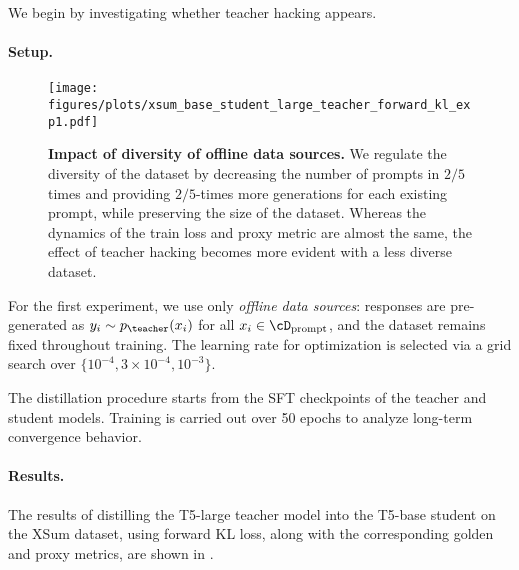 We begin by investigating whether teacher hacking appears. %

\paragraph{Setup.}
\begin{figure*}[ht]
    \centering
    \texttt{[image: figures/plots/xsum\_base\_student\_large\_teacher\_forward\_kl\_exp1.pdf]}
    \caption{\textbf{Impact of diversity of offline data sources.} 
    We regulate the diversity of the dataset by decreasing the number of prompts in $2/5$ times and providing $2/5$-times more generations for each existing prompt, while preserving the size of the dataset.
    Whereas the dynamics of the train loss and proxy metric are almost the same, the effect of teacher hacking becomes more evident with a less diverse dataset.    
    }
    \label{fig:exp_large_to_base_diversity_fwd_kl}

\end{figure*}


For the first experiment, we use only \textit{offline data sources}: responses are pre-generated as $y_i \sim p_{\teacher}(x_i)$ for all $x_i \in \cD_{\mathrm{prompt}}$, and the dataset remains fixed throughout training. The learning rate for optimization is selected via a grid search over $\{ 10^{-4}, 3 \times 10^{-4}, 10^{-3} \}$.%

The distillation procedure starts from the SFT checkpoints of the teacher and student models. Training is carried out over 50 epochs to analyze long-term convergence behavior. 


\paragraph{Results.}
The results of distilling the T5-large teacher model into the T5-base student on the XSum dataset, using forward KL loss, along with the corresponding golden and proxy metrics, are shown in .



